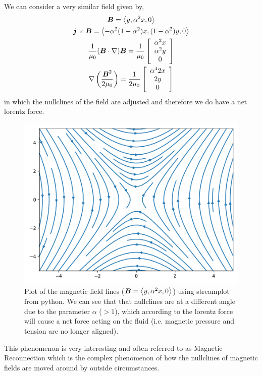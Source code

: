 \documentclass{article}
\begin{document}
We can consider a very similar field given by, 
\begin{gather*}
    \boldsymbol{B} = \left<y, \alpha^2x, 0\right> \\
    \boldsymbol{j} \times \boldsymbol{B} = \left< -\alpha^2(1 - \alpha^2)x, (1-\alpha^2)y,
    0\right>\\
    \frac{1}{\mu_0}(\boldsymbol{B}\cdot\nabla)\boldsymbol{B} = \frac{1}{\mu_0}\left[\begin{array}{c}
    \alpha^2x\\\alpha^2y\\0\end{array}\right]\\
    \nabla\left(\frac{\boldsymbol{B}^2}{2\mu_0}\right) =
    \frac{1}{2\mu_0}\left[\begin{array}{c} \alpha^42x\\2y\\0\end{array}\right]
\end{gather*}
in which the nullclines of the field are adjusted and therefore we do have
a net lorentz force. 
\begin{figure}
    \centering
    \includegraphics[width=.7\textwidth]{plots/ex5_fieldlines.pdf}
    \caption{Plot of the magnetic field lines ($\boldsymbol{B} = \left<y, \alpha^2x,
    0\right>$) using streamplot from python. We
    can see that that nullclines are at a different angle due to the parameter
    $\alpha$ ($> 1$), which according to the lorentz force will cause a net force acting
    on the fluid (i.e. magnetic pressure and tension are no longer aligned).}
\end{figure}
This phenomenon is very interesting and often referred to as Magnetic
Reconnection which is the complex phenomenon of how the nullclines of magnetic
fields are moved around by outside circumstances. 
\end{document}
